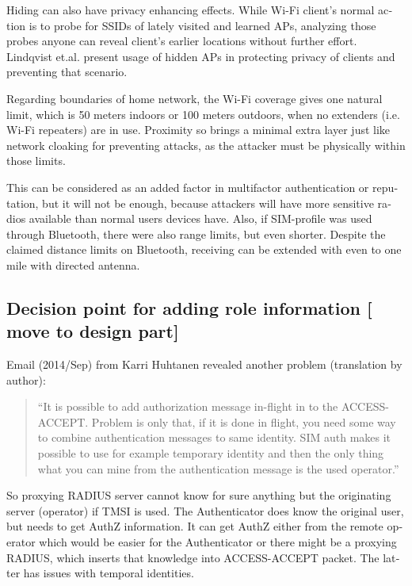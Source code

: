 \documentclass[12pt,a4paper,english]{tutthesis}
\begin{document}
\begin{otherlanguage}{english}
 Hiding can also have privacy enhancing effects.
While Wi-Fi client's normal action is to probe for SSIDs of lately visited
and learned APs, analyzing those probes anyone can reveal client's earlier
locations without further effort.
Lindqvist et.al.\cite{hidden-wlan} present usage of hidden
APs in protecting privacy of clients and preventing that scenario.



Regarding boundaries of home network, the Wi-Fi coverage gives 
one natural limit, which is 50 meters indoors or 100 meters outdoors,
when no extenders (i.e. Wi-Fi repeaters) are in use.
Proximity so brings a minimal extra layer just like network cloaking 
for preventing attacks, as the attacker must be physically within those limits.


This can be considered as an added factor in multifactor
authentication or reputation, but it will not be enough, because
attackers will have more sensitive  radios available than normal users
devices have. 
Also, if SIM-profile was used through Bluetooth, there were also
range limits, but even shorter. Despite the claimed distance limits
on Bluetooth, receiving can be extended with even to one mile with
directed antenna\cite{SANS-bluetooth-2007}.


\subsection{Decision point for adding role information [ move to design part]}
\label{sec-6-4-7}













Email (2014/Sep) from Karri Huhtanen revealed another
problem (translation by author):
\begin{quote}
``It is possible to add authorization message in-flight in to the
ACCESS-ACCEPT.
Problem is only that, if it is done in flight, you need some way to
combine authentication messages to same identity. SIM auth makes it
possible to use for example temporary identity and then the only thing
what you can mine from the authentication message is the used operator.''
\end{quote}

So proxying RADIUS server cannot know for sure anything but the
originating server (operator) if TMSI is used. The Authenticator does
know the original user, but needs to get AuthZ information. It can get
AuthZ either from the remote operator which would be easier for the
Authenticator or there might be a proxying RADIUS, which inserts that
knowledge into ACCESS-ACCEPT packet. The latter has issues with
temporal identities. 







\end{otherlanguage}
\end{document}
